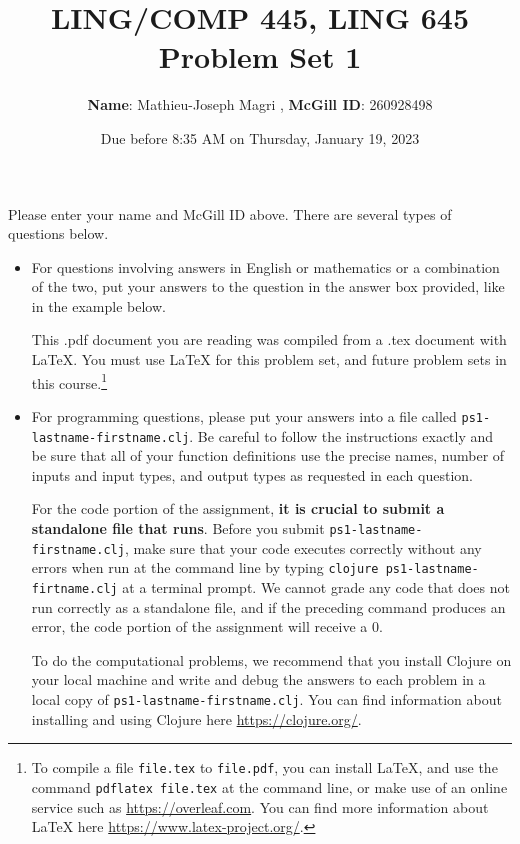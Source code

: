 \documentclass[10pt]{article}
\author{
  \textbf{Name}: Mathieu-Joseph Magri       %
, \textbf{McGill ID}: 260928498  %
}
\newcommand{\PSnum}{1}
\begin{document}
\title{LING/COMP 445, LING 645\\Problem Set \PSnum} \date{Due before 8:35 AM on
Thursday, January 19, 2023} \maketitle Please enter your name and McGill ID
above. There are several types of questions below.
\begin{itemize}
  \item For questions involving answers in English or mathematics or a
    combination of the two, put your answers to the question in the answer box
    provided, like in the example below.

    This .pdf document you are reading was compiled from a .tex document with
    \LaTeX. You must use \LaTeX{} for this problem set, and future problem sets
    in this course.\footnote{To compile a file \texttt{file.tex} to
      \texttt{file.pdf}, you can install \LaTeX{}, and use the command
      \texttt{pdflatex file.tex} at the command line, or make use of an online
      service such as \url{https://overleaf.com}. You can find more information
    about \LaTeX{} here \url{https://www.latex-project.org/}.}

  \item For programming questions, please put your answers into a file called
    \texttt{ps\PSnum-lastname-firstname.clj}. Be careful to follow the
    instructions exactly and be sure that all of your function definitions use
    the precise names, number of inputs and input types, and output types as
    requested in each question.

    For the code portion of the assignment, \textbf{it is crucial to submit a
    standalone file that runs}. Before you submit
    \texttt{ps\PSnum-lastname-firstname.clj}, make sure that your code executes
    correctly without any errors when run at the command line by typing
    \texttt{clojure ps\PSnum-lastname-firtname.clj} at a terminal prompt. We
    cannot grade any code that does not run correctly as a standalone file, and
    if the preceding command produces an error, the code portion of the
    assignment will receive a $0$.

    To do the computational problems, we recommend that you install Clojure on
    your local machine and write and debug the answers to each problem in a
    local copy of \texttt{ps\PSnum-lastname-firstname.clj}. You can find
    information about installing and using Clojure here
    \url{https://clojure.org/}.
\end{itemize}
\end{document}
